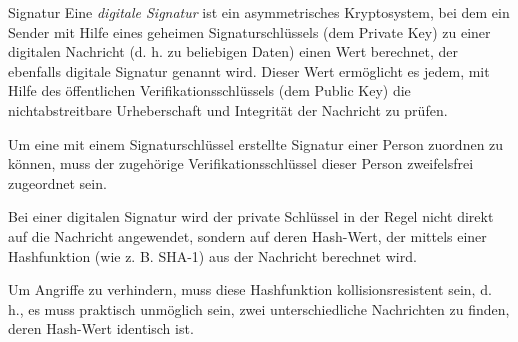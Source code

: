 \begin{defi}{Signatur}
    Eine \emph{digitale Signatur} ist ein asymmetrisches Kryptosystem, bei dem ein Sender mit Hilfe eines geheimen Signaturschlüssels (dem Private Key) zu einer digitalen Nachricht (d. h. zu beliebigen Daten) einen Wert berechnet, der ebenfalls digitale Signatur genannt wird.
    Dieser Wert ermöglicht es jedem, mit Hilfe des öffentlichen Verifikationsschlüssels (dem Public Key) die nichtabstreitbare Urheberschaft und Integrität der Nachricht zu prüfen.

    Um eine mit einem Signaturschlüssel erstellte Signatur einer Person zuordnen zu können, muss der zugehörige Verifikationsschlüssel dieser Person zweifelsfrei zugeordnet sein.

    Bei einer digitalen Signatur wird der private Schlüssel in der Regel nicht direkt auf die Nachricht angewendet, sondern auf deren Hash-Wert, der mittels einer Hashfunktion (wie z. B. SHA-1) aus der Nachricht berechnet wird.

    Um Angriffe zu verhindern, muss diese Hashfunktion kollisionsresistent sein, d. h., es muss praktisch unmöglich sein, zwei unterschiedliche Nachrichten zu finden, deren Hash-Wert identisch ist.
\end{defi}

